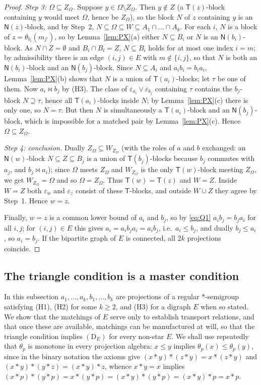 \documentclass[11pt]{amsart}
\theoremstyle{definition}
\newcommand{\T}{\mathsf{T}}
\newcommand{\N}{\mathsf{N}}
\newcommand{\mt}{\bowtie}      %
\begin{document}
\begin{proof}
\emph{Step 3: $\Omega\subseteq Z_\Omega$.} Suppose $y\in\Omega\setminus Z_\Omega$. Then $y\notin Z$ (a $\T(z)$-block containing $y$ would meet $\Omega$, hence be $Z_\Omega$), so the block $N$ of $z$ containing $y$ is an $\N(z)$-block, and by Step~2, $N\subseteq\Omega\subseteq W\subseteq A_1\cap\dots\cap A_k$. For each $i$, $N$ is a block of $z=\theta_{b_i}(m_{j'})$, so by Lemma~\ref{lem:PX}(a) either $N\subseteq B_i$ or $N$ is an $\N(b_i)$-block. As $N\cap Z=\emptyset$ and $B_i\cap B_l=Z$, $N\subseteq B_i$ holds for at most one index $i=m$; by admissibility there is an edge $(i,j)\in E$ with $m\notin\{i,j\}$, so that $N$ is both an $\N(b_i)$-block and an $\N(b_j)$-block. Since $N\subseteq A_i$ and $a_ib_i=b_ia_i$, Lemma~\ref{lem:PX}(b) shows that $N$ is a union of $\T(a_i)$-blocks; let $\tau$ be one of them. Now $a_i\mt b_j$ by (H3). The class of $\varepsilon_{a_i}\vee\varepsilon_{b_j}$ containing $\tau$ contains the $b_j$-block $N\supseteq\tau$, hence all $\T(a_i)$-blocks inside $N$; by Lemma~\ref{lem:PX}(c) there is only one, so $N=\tau$. But then $N$ is simultaneously a $\T(a_i)$-block and an $\N(b_j)$-block, which is impossible for a matched pair by Lemma~\ref{lem:PX}(c). Hence $\Omega\subseteq Z_\Omega$.

\emph{Step 4: conclusion.} Dually $Z_\Omega\subseteq W_{Z_\Omega}$ (with the roles of $a$ and $b$ exchanged: an $\N(w)$-block $N\subseteq Z\subseteq B_j$ is a union of $\T(b_j)$-blocks because $b_j$ commutes with $a_j$, and $b_j\mt a_i$); since $\Omega$ meets $Z_\Omega$ and $W_{Z_\Omega}$ is the only $\T(w)$-block meeting $Z_\Omega$, we get $W_{Z_\Omega}=\Omega$ and so $\Omega=Z_\Omega$. Thus $\T(w)=\T(z)$ and $W=Z$. Inside $W=Z$ both $\varepsilon_w$ and $\varepsilon_z$ consist of these $\T$-blocks, and outside $W\cup Z$ they agree by Step~1. Hence $w=z$.

Finally, $w=z$ is a common lower bound of $a_i$ and $b_j$, so by \eqref{eq:Q1} $a_ib_j=b_ja_i$ for all $i,j$; for $(i,j)\in E$ this gives $a_i=a_ib_ja_i=a_ib_j$, i.e.\ $a_i\le b_j$, and dually $b_j\le a_i$, so $a_i=b_j$. If the bipartite graph of $E$ is connected, all $2k$ projections coincide.
\end{proof}

\subsection{The triangle condition is a master condition}\label{subsec:master}

In this subsection $a_1,\dots,a_k,b_1,\dots,b_k$ are projections of a regular $*$-semigroup satisfying (H1), (H2) for some $k\ge2$, and (H3) for a digraph $E$ when so stated. We show that the matchings of $E$ serve only to establish transport relations, and that once these are available, matchings can be manufactured at will, so that the triangle condition implies $(\mathrm D_E)$ for every non-star $E$. We shall use repeatedly that $\theta_p$ is monotone in every projection algebra: $x\le y$ implies $\theta_p(x)\le\theta_p(y)$, since in the binary notation the axioms give $(x*y)*(z*y)=x*(z*y)$ and $(x*y)*(y*z)=(x*y)*z$, whence $x*y=x$ implies $(x*p)*(y*p)=x*(y*p)=(x*y)*(y*p)=(x*y)*p=x*p$.
\end{document}
